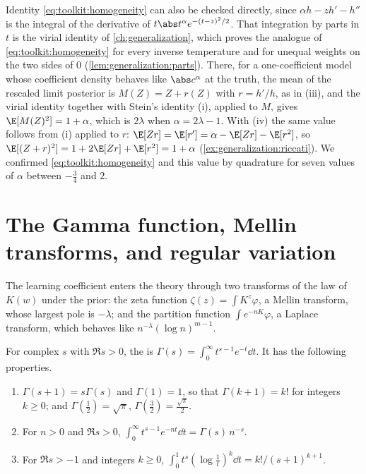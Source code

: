 \begin{refsection}
Identity \eqref{eq:toolkit:homogeneity} can also be checked directly, since $\alpha h-zh'-h''$ is the integral of the derivative of $t\abs t^\alpha e^{-(t-z)^2/2}$. That integration by parts in $t$ is the virial identity of \cref{ch:generalization}, which proves the analogue of \eqref{eq:toolkit:homogeneity} for every inverse temperature and for unequal weights on the two sides of $0$ (\cref{lem:generalization:parts}). There, for a one-coefficient model whose coefficient density behaves like $\abs c^\alpha$ at the truth, the mean of the rescaled limit posterior is $M(Z)=Z+r(Z)$ with $r=h'/h$, as in (iii), and the virial identity together with Stein's identity (i), applied to $M$, gives $\E[M(Z)^2]=1+\alpha$, which is $2\lambda$ when $\alpha=2\lambda-1$. With (iv) the same value follows from (i) applied to $r$: $\E[Zr]=\E[r']=\alpha-\E[Zr]-\E[r^2]$, so $\E[(Z+r)^2]=1+2\E[Zr]+\E[r^2]=1+\alpha$ (\cref{ex:generalization:riccati}). We confirmed \eqref{eq:toolkit:homogeneity} and this value by quadrature for seven values of $\alpha$ between $-\frac34$ and $2$.

\section{The Gamma function, Mellin transforms, and regular variation}\label{sec:toolkit:transforms}

The learning coefficient enters the theory through two transforms of the law of $K(w)$ under the prior: the zeta function $\zeta(z)=\int K^z\varphi$, a Mellin transform, whose largest pole is $-\lambda$; and the partition function $\int e^{-nK}\varphi$, a Laplace transform, which behaves like $n^{-\lambda}(\log n)^{m-1}$.

\begin{definition}\label{def:toolkit:gamma}
For complex $s$ with $\Re s>0$, the  is $\Gamma(s)=\int_0^\infty t^{s-1}e^{-t}\dd t$. It has the following properties.
\begin{enumerate}
\item $\Gamma(s+1)=s\Gamma(s)$ and $\Gamma(1)=1$, so that $\Gamma(k+1)=k!$ for integers $k\ge0$; and $\Gamma(\frac12)=\sqrt\pi$, $\Gamma(\frac32)=\frac{\sqrt\pi}2$.
\item For $n>0$ and $\Re s>0$, $\int_0^\infty t^{s-1}e^{-nt}\dd t=\Gamma(s)\,n^{-s}$.
\item For $\Re s>-1$ and integers $k\ge0$, $\int_0^1t^s(\log\frac1t)^k\dd t=k!/(s+1)^{k+1}$.
\end{enumerate}
\end{definition}


\end{refsection}
